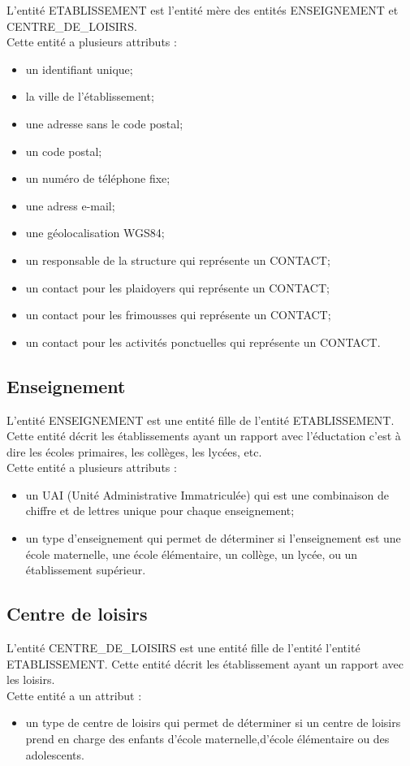\documentclass[asi, sansVersion]{picINSA}
\begin{document}
L'entité ETABLISSEMENT est l'entité mère des entités ENSEIGNEMENT et CENTRE\_DE\_LOISIRS. \\
Cette entité a plusieurs attributs : 
\begin{itemize}
\item un identifiant unique;
\item la ville de l'établissement;
\item une adresse sans le code postal;
\item un code postal;
\item un numéro de téléphone fixe;
\item une adress e-mail; %
\item une géolocalisation WGS84; %
\item un responsable de la structure qui représente un CONTACT; 
\item un contact pour les plaidoyers qui représente un CONTACT;
\item un contact pour les frimousses qui représente un CONTACT;
\item un contact pour les activités ponctuelles qui représente un CONTACT.
\end{itemize}

\subsection*{Enseignement}
L'entité ENSEIGNEMENT est une entité fille de l'entité ETABLISSEMENT. Cette entité décrit les établissements ayant un rapport avec l'éductation c'est à dire les écoles primaires, les collèges, les lycées, etc. \\
Cette entité a plusieurs attributs : 
\begin{itemize}
\item un UAI (Unité Administrative Immatriculée) qui est une combinaison de chiffre et de lettres unique pour chaque enseignement;
\item un type d'enseignement qui permet de déterminer si l'enseignement est une école maternelle, une école élémentaire, un collège, un lycée, ou un établissement supérieur. 
\end{itemize} 


\subsection*{Centre de loisirs}
L'entité CENTRE\_DE\_LOISIRS est une entité fille de l'entité l'entité ETABLISSEMENT. Cette entité décrit les établissement ayant un rapport avec les loisirs. \\
Cette entité a un attribut : 
\begin{itemize}
\item un type de centre de loisirs qui permet de déterminer si un centre de loisirs prend en charge des enfants d'école maternelle,d'école élémentaire ou des adolescents.
\end{itemize}  
\end{document}
